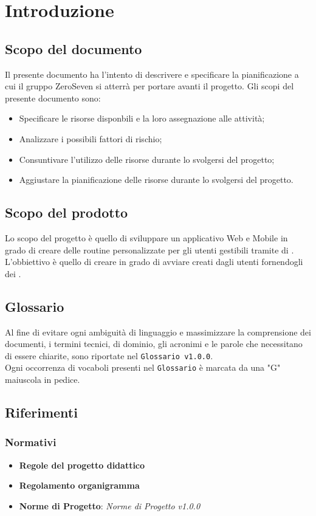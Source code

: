 \chapter{Introduzione}
\section{Scopo del documento}
Il presente documento ha l'intento di descrivere e specificare la pianificazione a cui il gruppo ZeroSeven si atterrà per portare avanti il progetto.
Gli scopi del presente documento sono:
\begin{itemize}
	\item Specificare le risorse disponbili e la loro assegnazione alle attività;
	\item Analizzare i possibili fattori di rischio;
	\item Consuntivare l'utilizzo delle risorse durante lo svolgersi del progetto;
	\item Aggiustare la pianificazione delle risorse durante lo svolgersi del progetto.
\end{itemize}
\section{Scopo del prodotto}
Lo scopo del progetto è quello di sviluppare un applicativo Web e Mobile in grado di creare delle routine personalizzate per gli utenti gestibili tramite  di . L'obbiettivo è quello di creare  in grado di avviare  creati dagli utenti fornendogli dei .
\section{Glossario}
Al fine di evitare ogni ambiguità di linguaggio e massimizzare la comprensione dei documenti, i termini tecnici, di dominio, gli acronimi e le parole che necessitano di essere chiarite, sono riportate nel \texttt{Glossario v1.0.0}.\\
Ogni occorrenza di vocaboli presenti nel \texttt{Glossario} è marcata da una "G" maiuscola in pedice.
\section{Riferimenti}
\subsection{Normativi}
\begin{itemize}
	\item \textbf{Regole del progetto didattico}
	\item  \textbf{Regolamento organigramma}
	\item  \textbf{Norme di Progetto}: \textit{Norme di Progetto v1.0.0}
\end{itemize}
